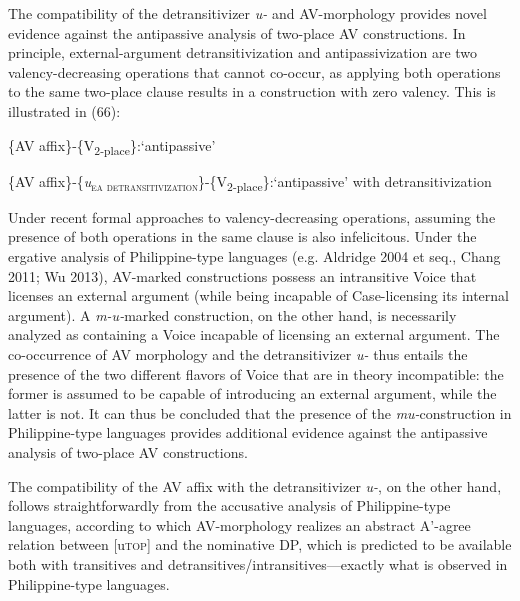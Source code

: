 \documentclass[10pt]{article}
\begin{document}
\bigskip


The compatibility of the detransitivizer \textit{u-} and AV-morphology provides novel evidence against the antipassive analysis of two-place AV constructions. In principle, external-argument detransitivization and antipassivization are two valency-decreasing operations that cannot co-occur, as applying both operations to the same two-place clause results in a construction with zero valency. This is illustrated in (66):


\begin{exe}
\begin{xlist}
		\ex \{AV affix\}-\{V\textsubscript{2-place}\}:\hspace{+3mm}`antipassive' 
		
		\ex \{AV affix\}-\{\textit{u}\textsubscript{\textsc{ea detransitivization}}\}-\{V\textsubscript{2-place}\}:\hspace{+3mm}`antipassive' with detransitivization
	\end{xlist}
\end{exe}

Under recent formal approaches to valency-decreasing operations, assuming the presence of both operations in the same clause is also infelicitous. Under the ergative analysis of Philippine-type languages (e.g. Aldridge 2004 et seq., Chang 2011; Wu 2013), AV-marked constructions possess an intransitive Voice that licenses an external argument (while being incapable of Case-licensing its internal argument). A \textit{m-u-}marked construction, on the other hand, is necessarily analyzed as containing a Voice incapable of licensing an external argument. The co-occurrence of  AV morphology and the detransitivizer \textit{u-} thus entails the presence of the two different flavors of Voice that are in theory incompatible: the former is assumed to be capable of introducing an external argument, while the latter is not. It can thus be concluded that the presence of the \textit{mu-}construction in Philippine-type languages provides additional evidence against the antipassive analysis of two-place AV constructions.


The compatibility of the AV affix with the detransitivizer \textit{u-}, on the other hand, follows straightforwardly from the accusative analysis of Philippine-type languages, according to which AV-morphology realizes an abstract A'-agree relation between [u\textsc{top}] and the nominative DP, which is predicted to be available both with transitives and detransitives/intransitives---exactly what is observed in Philippine-type languages. 
\end{document}
